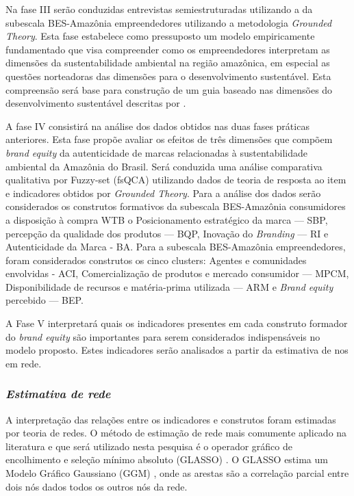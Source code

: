 Na fase III serão conduzidas entrevistas semiestruturadas utilizando a da subescala BES-Amazônia empreendedores utilizando a metodologia \textit{Grounded Theory}. Esta fase estabelece como pressuposto um modelo empiricamente fundamentado que visa compreender como os empreendedores interpretam as dimensões da sustentabilidade ambiental na região amazônica, em especial as questões norteadoras das dimensões para o desenvolvimento sustentável. Esta compreensão será base para construção de um guia baseado nas dimensões do desenvolvimento sustentável descritas por \cite{Foley2015UsingExperiences}.

A fase IV consistirá na análise dos dados obtidos nas duas fases práticas anteriores.  Esta fase propõe avaliar os efeitos de três dimensões que compõem \textit{brand equity} da autenticidade de marcas relacionadas à sustentabilidade ambiental da Amazônia do Brasil. Será conduzida uma análise comparativa qualitativa por Fuzzy-set (fsQCA) utilizando dados de teoria de resposta ao item e indicadores obtidos por \textit{Grounded Theory}. Para a análise dos dados serão considerados os construtos formativos da subescala BES-Amazônia consumidores a disposição à compra WTB o Posicionamento estratégico da marca — SBP, percepção da qualidade dos produtos — BQP, Inovação do \textit{Branding} — RI e Autenticidade da Marca - BA. Para a subescala BES-Amazônia empreendedores, foram considerados construtos os cinco clusters: Agentes e comunidades envolvidas - ACI, Comercialização de produtos e mercado consumidor — MPCM, Disponibilidade de recursos e matéria-prima utilizada — ARM e \textit{Brand equity} percebido — BEP.

A Fase V interpretará quais os indicadores presentes em cada construto formador do \textit{brand equity} são importantes para serem considerados indispensáveis no modelo proposto. Estes indicadores serão analisados a partir da estimativa de nos em rede.

\subsubsection*{\textit{Estimativa de rede}} 

A interpretação das relações entre os indicadores e construtos foram estimadas por teoria de redes. O método de estimação de rede mais comumente aplicado na literatura e que será utilizado nesta pesquisa é o operador gráfico de encolhimento e seleção mínimo absoluto (GLASSO) \cite{Friedman2008SparseLasso}. O GLASSO estima um Modelo Gráfico Gaussiano (GGM) \cite{Lauritzen19996GraphicalModels}, onde as arestas são a correlação parcial entre dois nós dados todos os outros nós da rede. 

